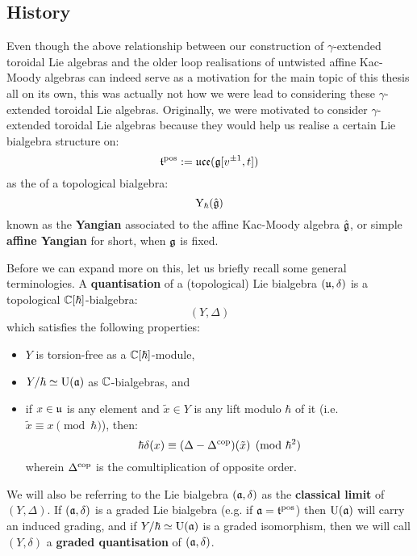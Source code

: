     \subsection{History} \label{subsection: history}
        Even though the above relationship between our construction of $\gamma$-extended toroidal Lie algebras and the older loop realisations of untwisted affine Kac-Moody algebras can indeed serve as a motivation for the main topic of this thesis all on its own, this was actually not how we were lead to considering these $\gamma$-extended toroidal Lie algebras. Originally, we were motivated to consider $\gamma$-extended toroidal Lie algebras because they would help us realise a certain Lie bialgebra structure on:
            $$\mathfrak{t}^{\mathrm{pos}} := \mathfrak{uce}(\mathfrak{g}[v^{\pm 1}, t])$$
        as the  of a topological bialgebra:
            $$\mathrm{Y}_{\hbar}(\hat{\mathfrak{g}})$$
        known as the \textbf{Yangian} associated to the affine Kac-Moody algebra $\hat{\mathfrak{g}}$, or simple  \textbf{affine Yangian} for short, when $\mathfrak{g}$ is fixed.

        Before we can expand more on this, let us briefly recall some general terminologies. A \textbf{quantisation} of a (topological) Lie bialgebra $(\mathfrak{u}, \delta)$ is a topological $\mathbb{C}[\hbar]$-bialgebra:
            $$(Y, \Delta)$$
        which satisfies the following properties:
        \begin{itemize}
            \item $Y$ is torsion-free as a $\mathbb{C}[\hbar]$-module,
            \item $Y/\hbar \simeq \mathrm{U}(\mathfrak{a})$ as $\mathbb{C}$-bialgebras, and
            \item if $x \in \mathfrak{u}$ is any element and $\tilde{x} \in Y$ is any lift modulo $\hbar$ of it (i.e. $\tilde{x} \equiv x \pmod{\hbar}$), then:
                $$\hbar\delta(x) \equiv (\Delta - \Delta^{\mathrm{cop}})(\tilde{x}) \pmod{\hbar^2}$$
            wherein $\Delta^{\mathrm{cop}}$ is the comultiplication of opposite order.
        \end{itemize}
        We will also be referring to the Lie bialgebra $(\mathfrak{a}, \delta)$ as the \textbf{classical limit} of $(Y, \Delta)$. If $(\mathfrak{a}, \delta)$ is a graded Lie bialgebra (e.g. if $\mathfrak{a} = \mathfrak{t}^{\mathrm{pos}}$) then $\mathrm{U}(\mathfrak{a})$ will carry an induced grading, and if $Y/\hbar \simeq \mathrm{U}(\mathfrak{a})$ is a graded isomorphism, then we will call $(Y, \delta)$ a \textbf{graded quantisation} of $(\mathfrak{a}, \delta)$.
        
